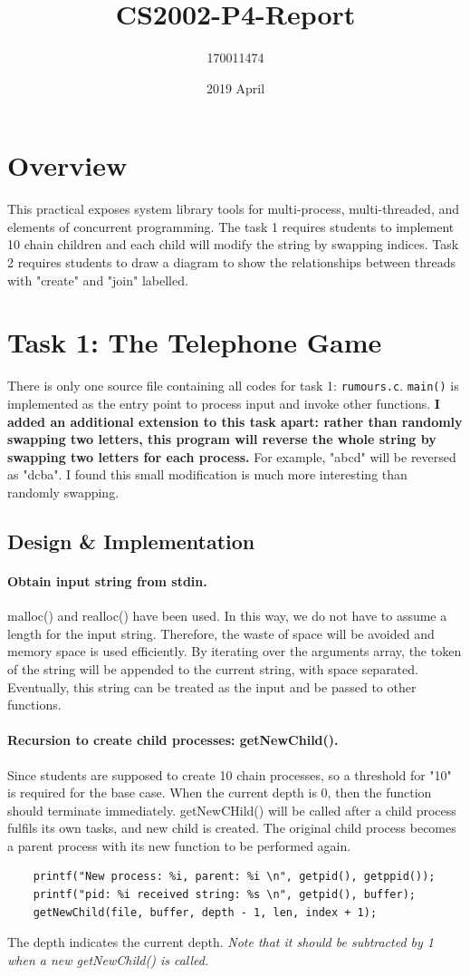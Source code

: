 \documentclass{article}
\title{CS2002-P4-Report}
\author{170011474}
\date{2019 April}
\begin{document}
  
\maketitle

\section{Overview}
This practical exposes system library tools for multi-process, multi-threaded, and elements of concurrent programming. The task 1 requires students to implement 10 chain children and each child will modify the string by swapping indices. Task 2 requires students to draw a diagram to show the relationships between threads with "create" and "join" labelled. 
\section{Task 1: The Telephone Game}
There is only one source file containing all codes for task 1: \texttt{rumours.c}. \texttt{main()} is implemented as the entry point to process input and invoke other functions. \textbf{I added an additional extension to this task apart: rather than randomly swapping two letters, this program will reverse the whole string by swapping two letters for each process.} For example, "abcd" will be reversed as "dcba". I found this small modification is much more interesting than randomly swapping. 
\subsection{Design \& Implementation}
\paragraph{Obtain input string from stdin. }
malloc() and realloc() have been used. In this way, we do not have to assume a length for the input string. Therefore, the waste of space will be avoided and memory space is used efficiently. By iterating over the arguments array, the token of the string will be appended to the current string, with space separated. Eventually, this string can be treated as the input and be passed to other functions.
\paragraph{Recursion to create child processes: getNewChild().}
Since students are supposed to create 10 chain processes, so a threshold for "10" is required for the base case. When the current depth is 0, then the function should terminate immediately. getNewCHild() will be called after a child process fulfils its own tasks, and new child is created. The original child process becomes a parent process with its new function to be performed again.
\begin{lstlisting}
	printf("New process: %i, parent: %i \n", getpid(), getppid());
	printf("pid: %i received string: %s \n", getpid(), buffer);
	getNewChild(file, buffer, depth - 1, len, index + 1);
\end{lstlisting}
The depth indicates the current depth. \textit{Note that it should be subtracted by 1 when a new getNewChild() is called.}
\end{document}
